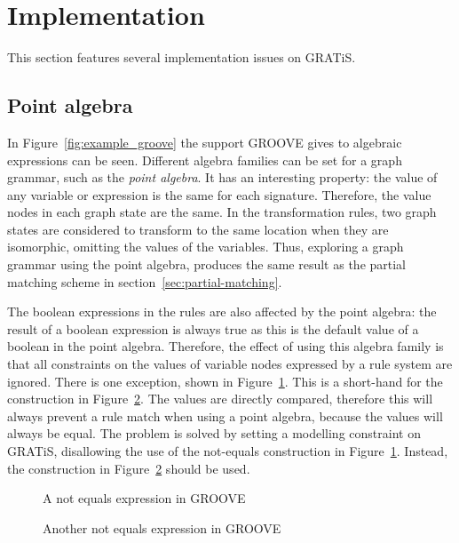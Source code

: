 \section{Implementation}\label{sec:implementation}

This section features several implementation issues on GRATiS.

\subsection{Point algebra}
In Figure~\ref{fig:example_groove} the support GROOVE gives to algebraic expressions can be seen. Different algebra families can be set for a graph grammar, such as the \textit{point algebra}. It has an interesting property: the value of any variable or expression is the same for each signature. Therefore, the value nodes in each graph state are the same. In the transformation rules, two graph states are considered to transform to the same location when they are isomorphic, omitting the values of the variables. Thus, exploring a graph grammar using the point algebra, produces the same result as the partial matching scheme in section~\ref{sec:partial-matching}. 

The boolean expressions in the rules are also affected by the point algebra: the result of a boolean expression is always true as this is the default value of a boolean in the point algebra. Therefore, the effect of using this algebra family is that all constraints on the values of variable nodes expressed by a rule system are ignored. There is one exception, shown in Figure~\ref{fig:not_equals_wrong}. This is a short-hand for the construction in Figure~\ref{fig:not_equals_right}. The values are directly compared, therefore this will always prevent a rule match when using a point algebra, because the values will always be equal. The problem is solved by setting a modelling constraint on GRATiS, disallowing the use of the not-equals construction in Figure~\ref{fig:not_equals_wrong}. Instead, the construction in Figure~\ref{fig:not_equals_right} should be used.

\begin{figure}[ht]
  \begin{center}
    
  \end{center}
  \caption{A not equals expression in GROOVE}
  \label{fig:not_equals_wrong}
\end{figure}

\begin{figure}[ht]
  \begin{center}
    
  \end{center}
  \caption{Another not equals expression in GROOVE}
  \label{fig:not_equals_right}
\end{figure}


